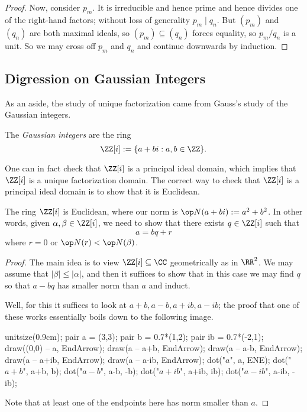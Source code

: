 \begin{proof}
	Now, consider $p_m$. It is irreducible and hence prime and hence divides one of the right-hand factors; without loss of generality $p_m\mid q_n$. But $(p_m)$ and $(q_n)$ are both maximal ideals, so $(p_m)\subseteq(q_n)$ forces equality, so $p_m/q_n$ is a unit. So we may cross off $p_m$ and $q_n$ and continue downwards by induction.
\end{proof}

\subsection{Digression on Gaussian Integers}
As an aside, the study of unique factorization came from Gauss's study of the Gaussian integers.
\begin{definition}
	The \textit{Gaussian integers} are the ring
	\[\ZZ[i]:=\{a+bi:a,b\in\ZZ\}.\]
\end{definition}
One can in fact check that $\ZZ[i]$ is a principal ideal domain, which implies that $\ZZ[i]$ is a unique factorization domain. The correct way to check that $\ZZ[i]$ is a principal ideal domain is to show that it is Euclidean.
\begin{lemma}
	The ring $\ZZ[i]$ is Euclidean, where our norm is $\op N(a+bi):=a^2+b^2$. In other words, given $\alpha,\beta\in\ZZ[i]$, we need to show that there exists $q\in\ZZ[i]$ such that
	\[a=bq+r\]
	where $r=0$ or $\op N(r)<\op N(\beta)$.
\end{lemma}
\begin{proof}
	The main idea is to view $\ZZ[i]\subseteq\CC$ geometrically as in $\RR^2$. We may assume that $|\beta|\le|\alpha|$, and then it suffices to show that in this case we may find $q$ so that $a-bq$ has smaller norm than $a$ and induct.
	
	Well, for this it suffices to look at $a+b,a-b,a+ib,a-ib$; the proof that one of these works essentially boils down to the following image.
	\begin{center}
		\begin{asy}
			unitsize(0.9cm);
			pair a = (3,3);
			pair b = 0.7*(1,2);
			pair ib = 0.7*(-2,1);
			draw((0,0) -- a, EndArrow);
			draw(a -- a+b, EndArrow);
			draw(a -- a-b, EndArrow);
			draw(a -- a+ib, EndArrow);
			draw(a -- a-ib, EndArrow);
			dot("$a$", a, ENE);
			dot("$a+b$", a+b, b);
			dot("$a-b$", a-b, -b);
			dot("$a+ib$", a+ib, ib);
			dot("$a-ib$", a-ib, -ib);
		\end{asy}
	\end{center}
	Note that at least one of the endpoints here has norm smaller than $a$.
\end{proof}
